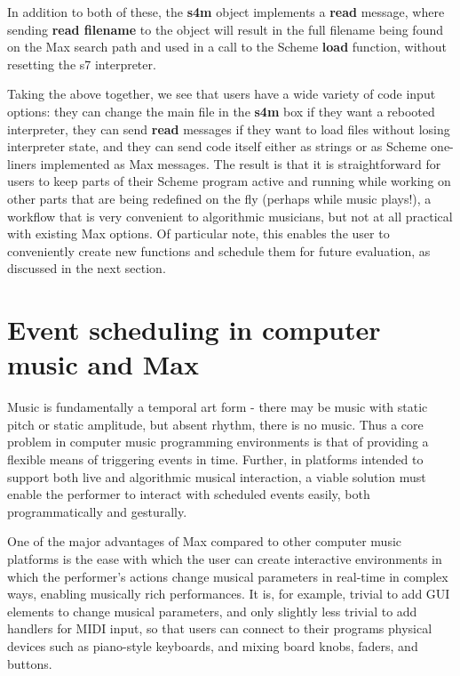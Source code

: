 \documentclass[acmsmall]{acmart}
\begin{document}

In addition to both of these, the \textbf{s4m} object implements a \textbf{read} message,
where sending \textbf{read filename} to the object will result in the full filename
being found on the Max search path and used in a call to the Scheme \textbf{load} function,
without resetting the s7 interpreter.

Taking the above together, we see that users have a wide variety of code input options:
they can change the main file in the \textbf{s4m} box if they want a rebooted interpreter,
they can send \textbf{read} messages if they want to load files without losing 
interpreter state, and they can send code itself either as strings or as Scheme
one-liners implemented as Max messages. The result is that it is straightforward
for users to keep parts of their Scheme program active and running
while working on other parts that are being redefined on the fly (perhaps while music plays!),
a workflow that is very convenient to algorithmic musicians, but not at all practical with existing
Max options. Of particular note, this enables the user to
conveniently create new functions and schedule them for future evaluation,
as discussed in the next section.


\section{Event scheduling in computer music and Max}

Music is fundamentally a temporal art form - there may be music with static pitch
or static amplitude, but absent rhythm, there is no music.  
Thus a core problem in computer music programming environments is that of providing a flexible 
means of triggering events in time. Further, in platforms intended to support both
live and algorithmic musical interaction, a viable solution must enable the performer
to interact with scheduled events easily, both programmatically and gesturally. 

One of the major advantages of Max compared to other computer music platforms 
is the ease with which the user can create interactive environments in which the performer's actions 
change musical parameters in real-time in complex ways, enabling 
musically rich performances. It is, for example, trivial to add GUI elements to change
musical parameters, and only slightly less trivial to add handlers for MIDI input, 
so that users can connect to their programs physical devices such as
piano-style keyboards, and mixing board knobs, faders, and buttons. 
\end{document}
